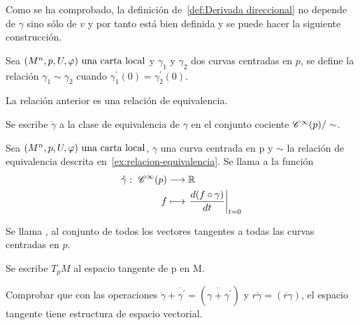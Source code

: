 Como se ha comprobado, la definición de~\ref{def:Derivada direccional} no depende de $\gamma$
sino sólo de $v$ y por tanto está bien definida y se puede hacer la siguiente construcción.

Sea $(M^n,p,U,\varphi)\textmd{ una carta local}$ y $\gamma_1$ y $\gamma_2$ dos curvas centradas en $p$, se define la relación
$\gamma_1\sim\gamma_2$ cuando $\gamma_1^{'}(0)=\gamma_2^{'}(0)$.

\begin{exercise}
  \label{ex:relacion-equivalencia}
  La relación anterior es una relación de equivalencia.
\end{exercise}
\begin{notation}
Se escribe $\mathring{\gamma}$ a la clase de equivalencia de $\gamma$ en el conjunto cociente
$\mathscr{C}^\infty(p)/\sim$.
\end{notation}

\begin{definition}
  Sea $(M^n,p,U,\varphi)\textmd{ una carta local}$, $\gamma$ una curva centrada en p y $\sim$ la relación de equivalencia
  descrita en~\ref{ex:relacion-equivalencia}.
  Se llama  a la
  función
  \begin{equation}
    \label{eq:vector-tangente-curva}
    \begin{alignedat}{1}
      \mathring{\gamma}:\ \mathscr{C}^\infty(p) & \longrightarrow \mathbb{R} \\ f & \longmapsto \left.\frac{d(f\circ\gamma)}{dt}\right|_{t=0}
    \end{alignedat}
  \end{equation}
\end{definition}
\begin{definition}
  Se llama , al
  conjunto de todos los vectores tangentes a todas las curvas centradas en $p$.
\end{definition}
\begin{notation}
  Se escribe $T_pM$ al espacio tangente de p en M.
\end{notation}

\begin{exercise}
  Comprobar que con las operaciones $\mathring{\gamma}+\mathring{\gamma^\prime}=
  (\mathring{\gamma+\gamma^\prime})$ y $r\mathring{\gamma}=(\mathring{r\gamma})$, el espacio
  tangente tiene estructura de espacio vectorial.
\end{exercise}
